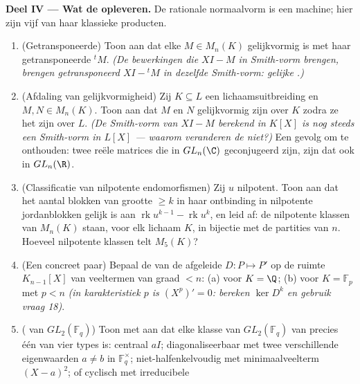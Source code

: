 \begin{problem}
\medskip
\noindent\textbf{Deel IV --- Wat de 
opleveren.} De rationale normaalvorm is een machine; hier zijn vijf
van haar klassieke producten.
\begin{enumerate}[resume]
  \item (Getransponeerde) Toon aan dat elke $M \in M_n(K)$
        gelijkvormig is met haar getransponeerde ${}^tM$. \emph{(De
        bewerkingen die $XI - M$ in Smith-vorm brengen, brengen
        getransponeerd $XI - {}^tM$ in dezelfde Smith-vorm: gelijke
        .)}
  \item (Afdaling van gelijkvormigheid) Zij $K \subseteq L$ een
        lichaamsuitbreiding en $M, N \in M_n(K)$. Toon aan dat $M$
        en $N$ gelijkvormig zijn over $K$ zodra ze het zijn over
        $L$. \emph{(De Smith-vorm van $XI - M$ berekend in $K[X]$
        is nog steeds een Smith-vorm in $L[X]$ --- waarom
        veranderen de  niet?)} Een gevolg om te
        onthouden: twee reële matrices die in $GL_n(\C)$
        geconjugeerd zijn, zijn dat ook in $GL_n(\R)$.
  \item (Classificatie van nilpotente endomorfismen) Zij $u$
        nilpotent. Toon aan dat het aantal blokken van grootte
        $\geq k$ in haar ontbinding in nilpotente jordanblokken
        gelijk is aan $\operatorname{rk}u^{k-1} -
        \operatorname{rk}u^k$, en leid af: de nilpotente klassen
        van $M_n(K)$ staan, voor elk lichaam $K$, in bijectie met
        de partities van $n$. Hoeveel nilpotente klassen telt
        $M_5(K)$?
  \item (Een concreet paar) Bepaal de
         van de afgeleide $D\colon P
        \mapsto P'$ op de ruimte $K_{n-1}[X]$ van veeltermen van
        graad $< n$: (a) voor $K = \Q$; (b) voor $K = \mathbb F_p$
        met $p < n$ \emph{(in karakteristiek $p$ is $(X^p)' = 0$:
        bereken $\ker D^k$ en gebruik vraag 18)}.
  \item ( van $GL_2(\mathbb F_q)$) Toon met
         aan dat elke klasse van $GL_2(\mathbb
        F_q)$ van precies één van vier types is: centraal $aI$;
        diagonaliseerbaar met twee verschillende eigenwaarden $a
        \neq b$ in $\mathbb F_q^\times$; niet-halfenkelvoudig met
        minimaalveelterm $(X - a)^2$; of cyclisch met irreducibele

\end{enumerate}
\end{problem}
